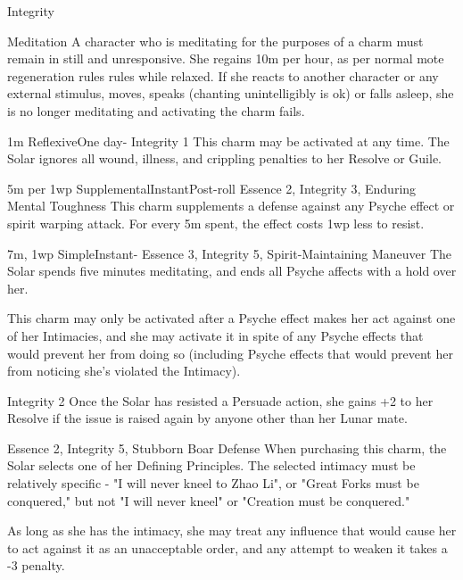 \begin{Ability}{Integrity}
\begin{sidebar}{Meditation}
  A character who is meditating for the purposes of a charm must remain in still and unresponsive. She regains 10m per hour, as per normal mote regeneration rules rules while relaxed. If she reacts to another character or any external stimulus, moves, speaks (chanting unintelligibly is ok) or falls asleep, she is no longer meditating and activating the charm fails.
\end{sidebar}

  {1m}
  {Reflexive}{One day}{-}
  {Integrity 1}
  This charm may be activated at any time. The Solar ignores all wound, illness, and crippling penalties to her Resolve or Guile.

  {5m per 1wp}
  {Supplemental}{Instant}{Post-roll}
  {Essence 2, Integrity 3, Enduring Mental Toughness}
  This charm supplements a defense against any Psyche effect or spirit warping attack. For every 5m spent, the effect costs 1wp less to resist.

  {7m, 1wp}
  {Simple}{Instant}{-}
  {Essence 3, Integrity 5, Spirit-Maintaining Maneuver}
  The Solar spends five minutes meditating, and ends all Psyche affects with a hold over her.

  This charm may only be activated after a Psyche effect makes her act against one of her Intimacies, and she may activate it in spite of any Psyche effects that would prevent her from doing so (including Psyche effects that would prevent her from noticing she's violated the Intimacy).

  {Integrity 2}
  Once the Solar has resisted a Persuade action, she gains +2 to her Resolve if the issue is raised again by anyone other than her Lunar mate.

  {Essence 2, Integrity 5, Stubborn Boar Defense}
  When purchasing this charm, the Solar selects one of her Defining Principles. The selected intimacy must be relatively specific - "I will never kneel to Zhao Li", or "Great Forks must be conquered," but not "I will never kneel" or "Creation must be conquered."

  As long as she has the intimacy, she may treat any influence that would cause her to act against it as an unacceptable order, and any attempt to weaken it takes a -3 penalty.


\end{Ability}

